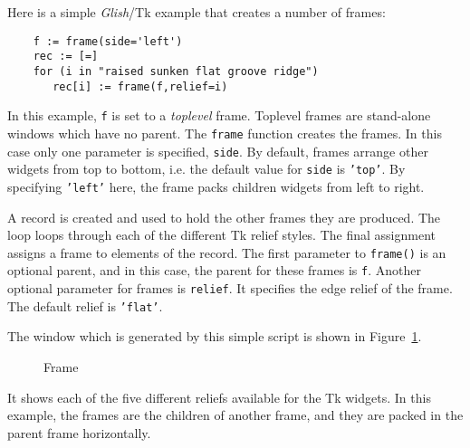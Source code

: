 Here is a simple {\em Glish}/Tk example that creates a number of frames:
\begin{verbatim}
    f := frame(side='left')
    rec := [=]
    for (i in "raised sunken flat groove ridge")
       rec[i] := frame(f,relief=i)
\end{verbatim}
In this example, {\tt f} is set to  a {\em toplevel} frame. Toplevel frames
are stand-alone windows which have no parent. The {\tt frame} function
 creates the  frames. In this case only one parameter is specified,
{\tt side}. By default, frames arrange other widgets from top to bottom, i.e.
the default value for {\tt side} is {\tt 'top'}. By specifying {\tt 'left'}
here, the frame packs children widgets from left to right.

A record is created and used to hold the other frames they are
produced. The loop loops through each of the different Tk relief 
styles. The final
assignment assigns a frame to  elements of the record.
The first parameter to \verb+frame()+ is an optional parent, and in this case, the
parent for these frames is {\tt f}. Another optional parameter for frames is
{\tt relief}. It specifies the edge relief of the frame. The default relief
is {\tt 'flat'}.

The window which is generated by this simple script is shown in
Figure~\ref{tkframe}.
\begin{figure}[thb]
\centerline{}
\caption{ Frame }
\label{tkframe}
\end{figure}
It shows each of the five different reliefs available for
the Tk widgets. In this example, the frames are the children of another
frame, and they are packed in the parent frame horizontally.

